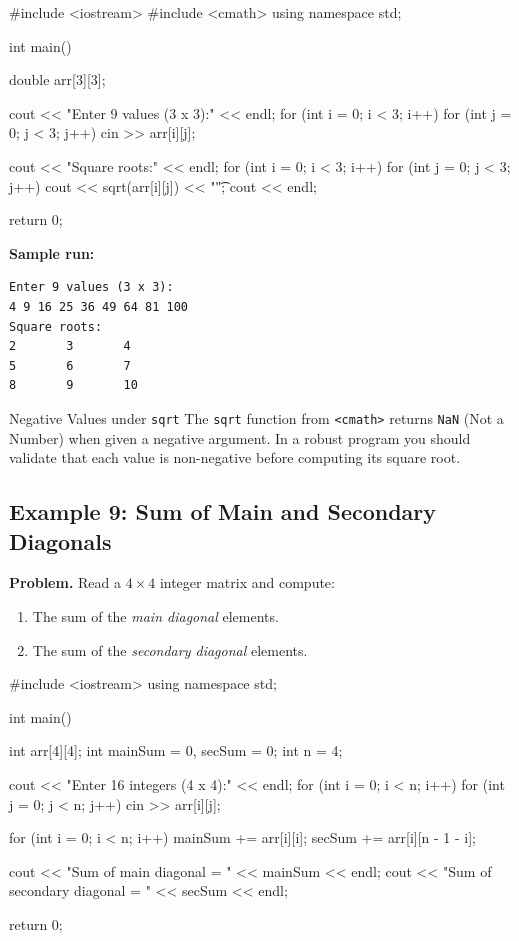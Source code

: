 \begin{cppcode}
#include <iostream>
#include <cmath>
using namespace std;

int main() {
    double arr[3][3];

    cout << "Enter 9 values (3 x 3):" << endl;
    for (int i = 0; i < 3; i++)
        for (int j = 0; j < 3; j++)
            cin >> arr[i][j];

    cout << "Square roots:" << endl;
    for (int i = 0; i < 3; i++) {
        for (int j = 0; j < 3; j++) {
            cout << sqrt(arr[i][j]) << "\t";
        }
        cout << endl;
    }

    return 0;
}
\end{cppcode}

\textbf{Sample run:}
\begin{verbatim}
Enter 9 values (3 x 3):
4 9 16 25 36 49 64 81 100
Square roots:
2       3       4
5       6       7
8       9       10
\end{verbatim}

\begin{warningbox}{Negative Values under \texttt{sqrt}}
The \texttt{sqrt} function from \texttt{<cmath>} returns \texttt{NaN}
(Not a Number) when given a negative argument. In a robust program you
should validate that each value is non-negative before computing its
square root.
\end{warningbox}

\subsection{Example 9: Sum of Main and Secondary Diagonals}

\textbf{Problem.} Read a $4 \times 4$ integer matrix and compute:
\begin{enumerate}
    \item The sum of the \emph{main diagonal} elements.
    \item The sum of the \emph{secondary diagonal} elements.
\end{enumerate}

\begin{cppcode}
#include <iostream>
using namespace std;

int main() {
    int arr[4][4];
    int mainSum = 0, secSum = 0;
    int n = 4;

    cout << "Enter 16 integers (4 x 4):" << endl;
    for (int i = 0; i < n; i++)
        for (int j = 0; j < n; j++)
            cin >> arr[i][j];

    for (int i = 0; i < n; i++) {
        mainSum += arr[i][i];
        secSum  += arr[i][n - 1 - i];
    }

    cout << "Sum of main diagonal      = "
         << mainSum << endl;
    cout << "Sum of secondary diagonal  = "
         << secSum  << endl;

    return 0;
}
\end{cppcode}

